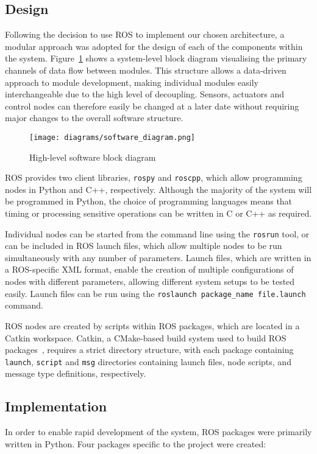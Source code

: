 \subsection{Design}\label{soft/ROS/design}
Following the decision to use ROS to implement our chosen architecture, a modular
approach was adopted for the design of each of the components within the system.
Figure~\ref{fig:software_block_diagram} shows a system-level block diagram visualising the
primary channels of data flow between modules. This structure allows a
data-driven approach to module development, making individual modules easily
interchangeable due to the high level of decoupling. Sensors, actuators and
control nodes can therefore easily be changed at a later date without requiring
major changes to the overall software structure.

\begin{figure}[!ht]
	\centering
	\texttt{[image: diagrams/software\_diagram.png]}
	\caption{High-level software block diagram}\label{fig:software_block_diagram}
\end{figure}

ROS provides two client libraries, \verb|rospy| and \verb|roscpp|, which allow
programming nodes in Python and C++, respectively. Although the majority of
the system will be programmed in Python, the choice of programming languages
means that timing or processing sensitive operations can be written in C or C++
as required.

Individual nodes can be started from the command line using the \verb|rosrun|
tool, or can be included in ROS launch files, which allow multiple nodes to
be run simultaneously with any number of parameters. Launch files, which are
written in a ROS-specific XML format, enable the
creation of multiple configurations of nodes with different parameters,
allowing different system setups to be tested easily. Launch files can be run
using the \verb|roslaunch package_name file.launch| command.

ROS nodes are created by scripts within ROS packages, which are located in a
Catkin workspace. Catkin, a CMake-based build system used to build ROS
packages~\cite{gitcatkin}, requires a strict directory structure, with each
package containing \verb|launch|, \verb|script| and \verb|msg| directories
containing launch files, node scripts, and message type definitions,
respectively.

\subsection{Implementation}\label{soft/ROS/impl}
In order to enable rapid development of the system, ROS packages were
primarily written in Python. Four packages specific to the project were
created:

